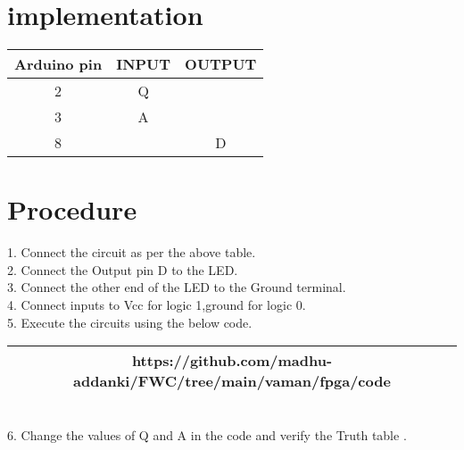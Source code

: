 \documentclass{article}
\begin{document}
\section{implementation}
\begin{table}[h]
  \centering
  \begin{tabular}{|c|c|c|}
\hline
\textbf{Arduino pin} & \textbf{INPUT} & \textbf{OUTPUT}\\
\hline
2 & Q &\\
\hline
3 & A &\\
\hline
8 & & D\\
\hline
  \end{tabular}
\end{table}
\section{Procedure}
   1. Connect the circuit as per the above table.\\
   2. Connect the Output pin D to the LED.\\
   3. Connect the other end of the LED to the Ground terminal.\\
   4. Connect inputs to Vcc for logic 1,ground for logic 0.\\
   5. Execute the circuits using the below code.\\
   \begin{table}[h]
	   \centering
	   \begin{tabular}{|c|}
	   \hline
	   https://github.com/madhu-addanki/FWC/tree/main/vaman/fpga/code\\
	   \hline
	   \end{tabular}
   \end{table}\\
   6. Change the values of Q and A in the code and verify the Truth table .\\

 
\end{document}
